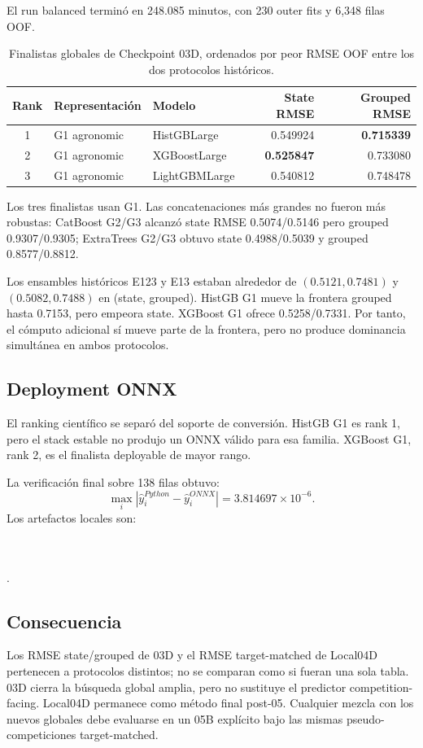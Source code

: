 El run balanced terminó en 248.085 minutos, con 230 outer fits y 6,348 filas OOF.

\begin{table}[htbp]
\centering
\caption{Finalistas globales de Checkpoint 03D, ordenados por peor RMSE OOF entre los dos
protocolos históricos.}
\label{tab:cp03d-finalists}
\begin{tabular}{cllrr}
\toprule
Rank & Representación & Modelo & State RMSE & Grouped RMSE \\
\midrule
1 & G1 agronomic & HistGBLarge & 0.549924 & \textbf{0.715339} \\
2 & G1 agronomic & XGBoostLarge & \textbf{0.525847} & 0.733080 \\
3 & G1 agronomic & LightGBMLarge & 0.540812 & 0.748478 \\
\bottomrule
\end{tabular}
\end{table}

Los tres finalistas usan G1. Las concatenaciones más grandes no fueron más robustas: CatBoost
G2/G3 alcanzó state RMSE 0.5074/0.5146 pero grouped 0.9307/0.9305; ExtraTrees G2/G3 obtuvo
state 0.4988/0.5039 y grouped 0.8577/0.8812.

Los ensambles históricos E123 y E13 estaban alrededor de
$(0.5121,0.7481)$ y $(0.5082,0.7488)$ en (state, grouped). HistGB G1 mueve la frontera grouped
hasta 0.7153, pero empeora state. XGBoost G1 ofrece 0.5258/0.7331. Por tanto, el cómputo
adicional sí mueve parte de la frontera, pero no produce dominancia simultánea en ambos
protocolos.

\subsection{Deployment ONNX}

El ranking científico se separó del soporte de conversión. HistGB G1 es rank 1, pero el stack
estable no produjo un ONNX válido para esa familia. XGBoost G1, rank 2, es el finalista
deployable de mayor rango.

La verificación final sobre 138 filas obtuvo:
\[
\max_i |\hat y_i^{Python}-\hat y_i^{ONNX}|
=
3.814697\times10^{-6}.
\]
Los artefactos locales son:
\begin{center}
\\
\\
.
\end{center}

\subsection{Consecuencia}

Los RMSE state/grouped de 03D y el RMSE target-matched de Local04D pertenecen a protocolos
distintos; no se comparan como si fueran una sola tabla. 03D cierra la búsqueda global amplia,
pero no sustituye el predictor competition-facing. Local04D permanece como método final
post-05. Cualquier mezcla con los nuevos globales debe evaluarse en un 05B explícito bajo las
mismas pseudo-competiciones target-matched.
